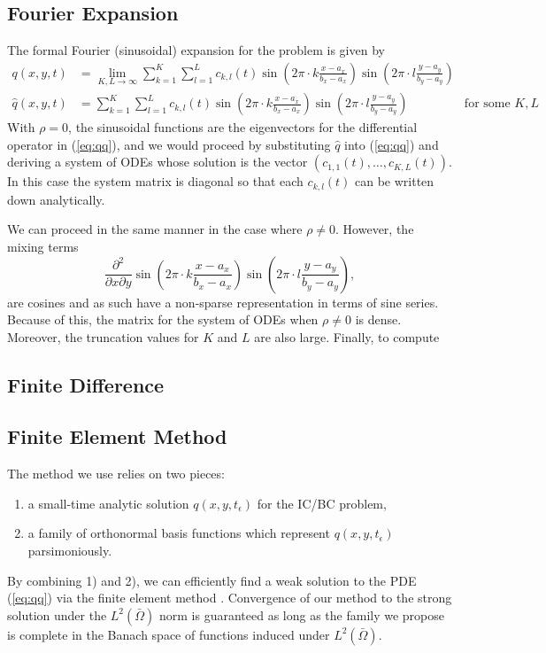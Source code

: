 \documentclass[10pt]{article}
\begin{document}
\subsection{Fourier Expansion}
The formal Fourier (sinusoidal) expansion for the problem is given by
\begin{align*}
  q(x,y,t) &= \lim_{K,L\to\infty}\sum_{k=1}^K \sum_{l=1}^L c_{k,l}(t) \sin\left(2\pi\cdot k \frac{x-a_x}{b_x-a_x}\right) \sin\left(2\pi\cdot l \frac{y-a_y}{b_y-a_y}\right) \\
  \hat{q}(x,y,t) &= \sum_{k=1}^K \sum_{l=1}^L c_{k,l}(t) \sin\left(2\pi\cdot k \frac{x-a_x}{b_x-a_x}\right) \sin\left(2\pi\cdot l \frac{y-a_y}{b_y-a_y}\right) & \mbox{for some } K, L
\end{align*}
With $\rho = 0$, the sinusoidal functions are the eigenvectors for the
differential operator in (\ref{eq:qq}), and we would proceed by
substituting $\hat{q}$ into (\ref{eq:qq}) and deriving a system of
ODEs whose solution is the vector $(c_{1,1}(t), \ldots,
c_{K,L}(t))$. In this case the system matrix is diagonal so that each
$c_{k,l}(t)$ can be written down analytically.

We can proceed in the same manner in the case where $\rho \neq
0$. However, the mixing terms
\[
  \frac{\partial^2}{\partial x \partial y} \sin\left(2\pi\cdot k
    \frac{x-a_x}{b_x-a_x}\right) \sin\left(2\pi\cdot l
    \frac{y-a_y}{b_y-a_y}\right),
\]
are cosines and as such have a non-sparse representation in terms of
sine series. Because of this, the matrix for the system of ODEs when
$\rho \neq 0$ is dense. Moreover, the truncation values for $K$ and
$L$ are also large. Finally, to compute 
\subsection{Finite Difference}


\subsection{Finite Element Method}
The method we use relies on two pieces:
\begin{enumerate}
\item a small-time analytic solution $q(x,y,t_\epsilon)$ for the IC/BC problem,
\item a family of orthonormal basis functions which represent
  $q(x,y,t_\epsilon)$ parsimoniously.
\end{enumerate}
By combining 1) and 2), we can efficiently find a weak solution to the
PDE (\ref{eq:qq}) via the finite element method
\citep{shaidurov2013multigrid}. Convergence of our method to the
strong solution under the $L^2(\bar{\Omega})$ norm is guaranteed as
long as the family we propose is complete in the Banach space of
functions induced under $L^2(\bar{\Omega})$.
\end{document}
